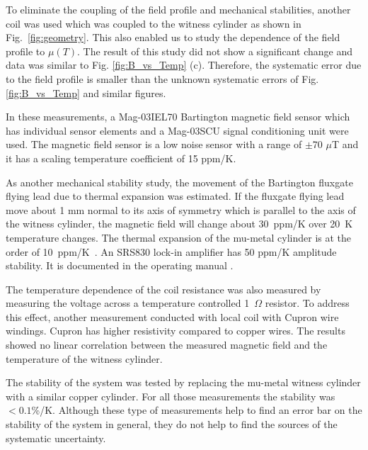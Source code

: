 To eliminate the coupling of the field profile and mechanical
stabilities, another coil was used which was coupled to the witness
cylinder as shown in Fig.~\ref{fig:geometry}.  This also enabled us to
study the dependence of the field profile to $\mu(T)$. The result of
this study did not show a significant change and data was similar to
Fig. \ref{fig:B_vs_Temp} (c). Therefore, the systematic error due to
the field profile is smaller than the unknown systematic errors of
Fig. \ref{fig:B_vs_Temp} and similar figures.


In these measurements, a Mag-03IEL70 Bartington magnetic field sensor which has individual sensor elements and a Mag-03SCU signal conditioning unit were used.
The magnetic field sensor is a low noise sensor with a range of $\pm$70 $\mu$T and it has a scaling temperature coefficient of 15 ppm/K.


As another mechanical stability study, the movement of the Bartington
fluxgate flying lead due to thermal expansion was estimated. If the
fluxgate flying lead move about 1 mm normal to its axis of symmetry
which is parallel to the axis of the witness cylinder, the magnetic
field will change about 30~ppm/K over 20~K temperature changes.  The
thermal expansion of the mu-metal cylinder is at the order of
10~ppm/K~\cite{kruppvdm}.  An SRS830 lock-in amplifier has 50
ppm/K amplitude stability. It is documented in the operating
manual \cite{bib:lockin}.

The temperature dependence of the coil resistance was also measured by
measuring the voltage across a temperature controlled 1~$\Omega$
resistor.
To address this effect, another measurement conducted with local coil with Cupron wire windings. Cupron has higher resistivity compared to copper wires. The results showed no linear correlation between the measured magnetic field and the temperature of the witness cylinder.

The stability of the system was tested by replacing the mu-metal
witness cylinder with a similar copper cylinder. For all those
measurements the stability was $<0.1$\%/K. Although these type of
measurements help to find an error bar on the stability of the system
in general, they do not help to find the sources of the systematic
uncertainty.


